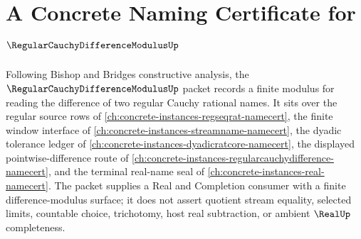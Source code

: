 \chapter{A Concrete Naming Certificate for $\RegularCauchyDifferenceModulusUp$}
\label{ch:concrete-instances-regular-cauchy-difference-modulus-namecert}

Following Bishop and Bridges constructive analysis, the $\RegularCauchyDifferenceModulusUp$ packet records a finite modulus for reading the difference of two regular Cauchy rational names. It sits over the regular source rows of \autoref{ch:concrete-instances-regseqrat-namecert}, the finite window interface of \autoref{ch:concrete-instances-streamname-namecert}, the dyadic tolerance ledger of \autoref{ch:concrete-instances-dyadicratcore-namecert}, the displayed pointwise-difference route of \autoref{ch:concrete-instances-regularcauchydifference-namecert}, and the terminal real-name seal of \autoref{ch:concrete-instances-real-namecert}. The packet supplies a Real and Completion consumer with a finite difference-modulus surface; it does not assert quotient stream equality, selected limits, countable choice, trichotomy, host real subtraction, or ambient $\RealUp$ completeness.

